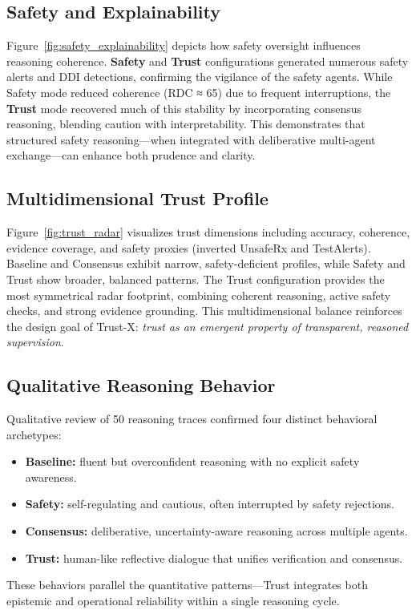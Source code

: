\documentclass[letterpaper]{article} %
\begin{document}
\subsection{Safety and Explainability}

Figure~\ref{fig:safety_explainability} depicts how safety oversight influences reasoning coherence.  
\textbf{Safety} and \textbf{Trust} configurations generated numerous safety alerts and DDI detections, confirming the vigilance of the safety agents.  
While Safety mode reduced coherence (RDC ≈ 65) due to frequent interruptions, the \textbf{Trust} mode recovered much of this stability by incorporating consensus reasoning, blending caution with interpretability.  
This demonstrates that structured safety reasoning—when integrated with deliberative multi-agent exchange—can enhance both prudence and clarity.

\subsection{Multidimensional Trust Profile}

Figure~\ref{fig:trust_radar} visualizes trust dimensions including accuracy, coherence, evidence coverage, and safety proxies (inverted UnsafeRx and TestAlerts).  
Baseline and Consensus exhibit narrow, safety-deficient profiles, while Safety and Trust show broader, balanced patterns.  
The Trust configuration provides the most symmetrical radar footprint, combining coherent reasoning, active safety checks, and strong evidence grounding.  
This multidimensional balance reinforces the design goal of Trust-X: \emph{trust as an emergent property of transparent, reasoned supervision}.

\subsection{Qualitative Reasoning Behavior}

Qualitative review of 50 reasoning traces confirmed four distinct behavioral archetypes:
\begin{itemize}
    \item \textbf{Baseline:} fluent but overconfident reasoning with no explicit safety awareness.
    \item \textbf{Safety:} self-regulating and cautious, often interrupted by safety rejections.
    \item \textbf{Consensus:} deliberative, uncertainty-aware reasoning across multiple agents.
    \item \textbf{Trust:} human-like reflective dialogue that unifies verification and consensus.
\end{itemize}
These behaviors parallel the quantitative patterns—Trust integrates both epistemic and operational reliability within a single reasoning cycle.
\end{document}
